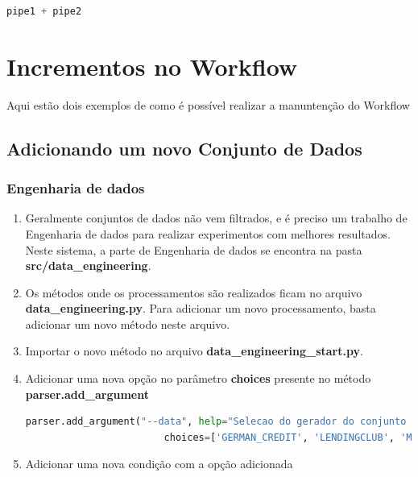 \documentclass[portugues]{ic-tese}
\begin{document}
\begin{lstlisting}[language=Python, label=cod:MergePipes]
    pipe1 + pipe2
\end{lstlisting}

\section{Incrementos no Workflow}

Aqui estão dois exemplos de como é possível realizar a manuntenção do Workflow

\subsection{Adicionando um novo Conjunto de Dados}

\subsubsection{Engenharia de dados}

\begin{enumerate}
\item Geralmente conjuntos de dados não vem filtrados, e é preciso um trabalho de Engenharia de dados para realizar experimentos com melhores resultados. Neste sistema, a parte de Engenharia de dados se encontra na pasta \textbf{src/data\_engineering}.

\item Os métodos onde os processamentos são realizados ficam no arquivo \textbf{data\_engineering.py}. Para adicionar um novo processamento, basta adicionar um novo método neste arquivo.

\item Importar o novo método no arquivo \textbf{data\_engineering\_start.py}.

\item Adicionar uma nova opção no parâmetro \textbf{choices} presente no método \textbf{parser.add\_argument}

\begin{lstlisting}[language=Python, label=cod:ParserAddArgument]
    parser.add_argument("--data", help="Selecao do gerador do conjunto de dados tratado",
                        choices=['GERMAN_CREDIT', 'LENDINGCLUB', 'METRICS'])
\end{lstlisting}

\item Adicionar uma nova condição com a opção adicionada
\end{enumerate}
\end{document}
